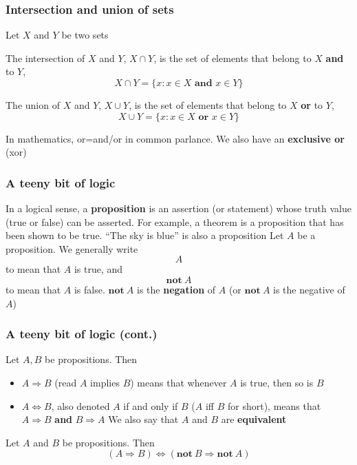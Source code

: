 \documentclass[aspectratio=169]{beamer}\usepackage[]{graphicx}\usepackage[]{xcolor}
\begin{document}
\begin{frame}
\frametitle{Intersection and union of sets}
	Let $X$ and $Y$ be two sets
	\vfill
	\begin{importantdefinition}[Intersection]
		The intersection of $X$ and $Y$, $X\cap Y$, is the set of elements that belong
		to $X$ \textbf{and} to $Y$,
		\[
		X\cap Y=\{x:x\in X\textbf{ and } x\in Y\}
		\]
	\end{importantdefinition}
	\vfill
	\begin{importantdefinition}[Union]
		The union of $X$ and $Y$, $X\cup Y$, is the set of elements that belong
		to $X$ \textbf{or} to $Y$,
		\[
		X\cup Y=\{x:x\in X\textbf{ or } x\in Y\}
		\]
	\end{importantdefinition}
In mathematics, or=and/or in common parlance. We also have an \textbf{exclusive or} (xor)
\end{frame}

\begin{frame}
\frametitle{A teeny bit of logic}
	In a logical sense, a \textbf{proposition} is an assertion (or statement)
	whose truth value (true or false) can be asserted. For example, a theorem is a
	proposition that has been shown to be true. ``The sky is blue'' is also a
	proposition
	\vfill
	Let $A$ be a proposition. We generally write
	\[
	A
	\]
	to mean that $A$ is true, and 
	\[
	\mathbf{not}\ A
	\]
	to mean that $A$ is false.
	$\mathbf{not}\ A$ is the \textbf{negation} of $A$ (or $\mathbf{not}\ A$
	is the negative of $A$)
\end{frame}

\begin{frame}
\frametitle{A teeny bit of logic (cont.)}
	Let $A,B$ be propositions. Then
	\begin{itemize}
		\item $A\Rightarrow B$ (read $A$ implies $B$) means that whenever $A$ is true,
		then so is $B$
		\item $A\Leftrightarrow B$, also denoted $A$ if and only if $B$ ($A$
		iff $B$ for short), means that $A\Rightarrow B$ \textbf{and} $B\Rightarrow A$\newline
		We also say that $A$ and $B$ are \textbf{equivalent}
	\end{itemize}
	\vfill
	Let $A$ and $B$ be propositions. Then
	\[
	(A\Rightarrow B)\Leftrightarrow(\mathbf{not}\ B\Rightarrow\mathbf{not}\ A)
	\]
\end{frame}
\end{document}
